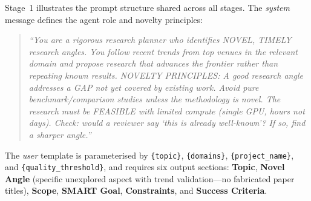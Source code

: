 \documentclass{llmxive}
\begin{document}
\begin{tcolorbox}[
  title={Stage~1 Deep Dive: \textsc{Topic\_Init}},
  colback=blue!3!white,
  colframe=blue!50!black,
  fonttitle=\bfseries\small,
  breakable,
  label={box:stage1-prompt},
]
Stage~1 illustrates the prompt structure shared across all stages.
The \emph{system} message defines the agent role and novelty principles:

\smallskip
\begin{quote}\small\itshape
``You are a rigorous research planner who identifies NOVEL, TIMELY research angles.
You follow recent trends from top venues in the relevant domain and propose research that advances the frontier rather than repeating known results.
NOVELTY PRINCIPLES: A good research angle addresses a GAP not yet covered by existing work.
Avoid pure benchmark/comparison studies unless the methodology is novel.
The research must be FEASIBLE with limited compute (single GPU, hours not days).
Check: would a reviewer say `this is already well-known'? If so, find a sharper angle.''
\end{quote}
\smallskip

The \emph{user} template is parameterised by \texttt{\{topic\}}, \texttt{\{domains\}}, \texttt{\{project\_name\}}, and \texttt{\{quality\_threshold\}}, and requires six output sections:
\textbf{Topic}, \textbf{Novel Angle} (specific unexplored aspect with trend validation---no fabricated paper titles), \textbf{Scope}, \textbf{SMART Goal}, \textbf{Constraints}, and \textbf{Success Criteria}.
\end{tcolorbox}
\end{document}
